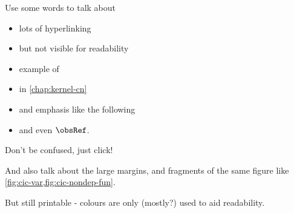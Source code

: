 
\begingroup

  \let\cleardoublepage\clearpage




Use some words to talk about
\begin{itemize}
    \item lots of hyperlinking
    \item but not visible for readability
    \item example of 
    \item in \cref{chap:kernel-cn}
    \item and emphasis like the following 
    \item and even $\obsRef$.
\end{itemize}

Don't be confused, just click!

And also talk about the large margins, and fragments of the same figure like
\cref{fig:cic-var,fig:cic-nondep-fun}.

But still printable - colours are only (mostly?) used to aid readability.

\endgroup


\cleardoubleevenemptypage


\begingroup %

\hypersetup{allcolors=.}

\setlength{\textheight}{230\vscale} %


